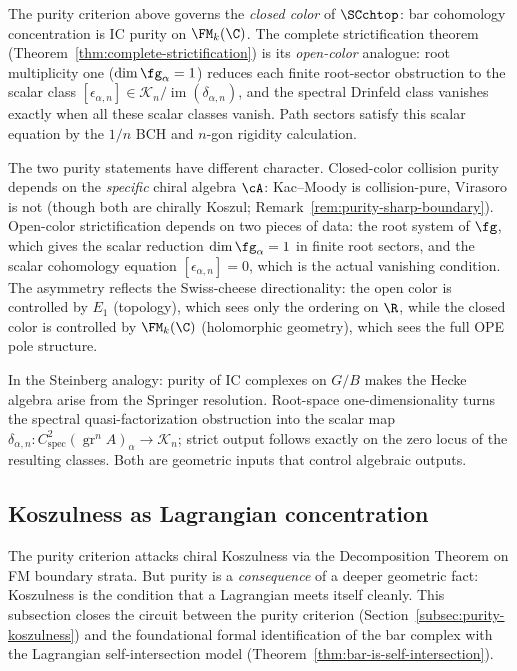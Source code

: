 \begin{remark}
\label{rem:closed-open-purity}
The purity criterion above governs the \emph{closed color} of
$\SCchtop$: bar cohomology concentration is IC purity on $\FM_k(\C)$.
The complete strictification theorem
(Theorem~\ref{thm:complete-strictification}) is its
\emph{open-color} analogue: root multiplicity one
($\dim\fg_\alpha=1$) reduces each finite root-sector obstruction to
the scalar class
$[\epsilon_{\alpha,n}]\in
\mathscr K_n/\operatorname{im}(\delta_{\alpha,n})$, and the spectral
Drinfeld class vanishes exactly when all these scalar classes vanish.
Path sectors satisfy this scalar equation by the $1/n$ BCH and
$n$-gon rigidity calculation.

The two purity statements have different character.
Closed-color collision purity depends on the \emph{specific}
chiral algebra $\cA$: Kac--Moody is collision-pure, Virasoro is
not (though both are chirally Koszul;
Remark~\ref{rem:purity-sharp-boundary}).
Open-color strictification depends on two pieces of data: the root
system of $\fg$, which gives the scalar reduction
$\dim\fg_\alpha=1$ in finite root sectors, and the scalar
cohomology equation $[\epsilon_{\alpha,n}]=0$, which is the actual
vanishing condition.
The asymmetry reflects the Swiss-cheese directionality: the open
color is controlled by $E_1$ (topology), which sees only the
ordering on $\R$, while the closed color is controlled by
$\FM_k(\C)$ (holomorphic geometry), which sees the full OPE
pole structure.

In the Steinberg analogy: purity of IC complexes on $G/B$ makes the
Hecke algebra arise from the Springer resolution. Root-space
one-dimensionality turns the spectral quasi-factorization obstruction
into the scalar map
$\delta_{\alpha,n}\colon
C^2_{\mathrm{spec}}(\operatorname{gr}^nA)_\alpha\to\mathscr K_n$;
strict output follows exactly on the zero locus of the resulting
classes. Both are geometric inputs that control algebraic outputs.
\end{remark}

\subsection{Koszulness as Lagrangian concentration}
\label{subsec:koszul-lagrangian-concentration}

\providecommand{\Steinb}{\mathfrak{S}}
\providecommand{\Mvac}{\mathcal{M}_{\mathrm{vac}}}

The purity criterion attacks chiral Koszulness via the
Decomposition Theorem on FM boundary strata. But purity is a
\emph{consequence} of a deeper geometric fact: Koszulness is the
condition that a Lagrangian meets itself cleanly. This subsection
closes the circuit between the purity criterion
\textup{(}Section~\textup{\ref{subsec:purity-koszulness}}\textup{)} and
the foundational formal identification of the bar complex with the
Lagrangian self-intersection model
\textup{(}Theorem~\textup{\ref{thm:bar-is-self-intersection}}\textup{)}.

